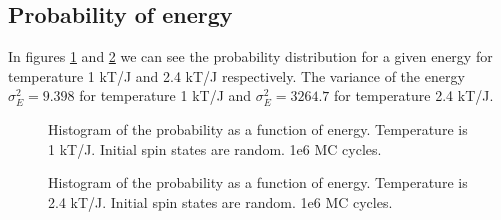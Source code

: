 \documentclass{emulateapj}
\begin{document}
\subsection{Probability of energy}
In figures \ref{fig:histT1} and \ref{fig:histT2.4} we can see the probability distribution for a given energy for temperature 1 kT/J and 2.4 kT/J respectively. The variance of the energy $\sigma_E^2 = 9.398$ for temperature 1 kT/J and $\sigma_E^2 = 3264.7$ for temperature 2.4 kT/J.
%
\begin{figure}
\mbox{}
\caption{Histogram of the probability as a function of energy. Temperature is 1 kT/J. Initial spin states are random. 1e6 MC cycles.}
\label{fig:histT1}
\end{figure}
%
\begin{figure}
\mbox{}
\caption{Histogram of the probability as a function of energy. Temperature is 2.4 kT/J. Initial spin states are random. 1e6 MC cycles.}
\label{fig:histT2.4}
\end{figure}
\end{document}
